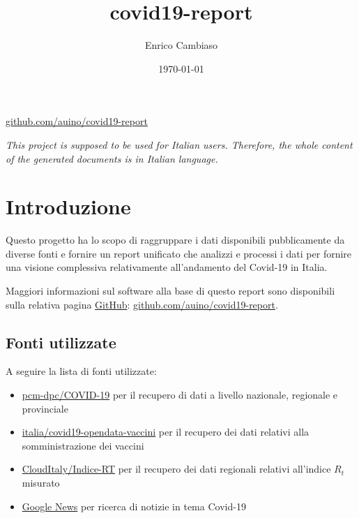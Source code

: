 \documentclass[12pt]{article}
\title{covid19-report}
\author{Enrico Cambiaso}
\date{\today}
\begin{document}
\begin{titlepage}
\maketitle
\thispagestyle{empty}
\vfill
{\centering \small \href{http://github.com/auino/covid19-report}{github.com/auino/covid19-report} \par}
\end{titlepage}

\tableofcontents

\newpage

\begin{center}
\emph{This project is supposed to be used for Italian users. Therefore, the whole content of the generated documents is in Italian language.}
\end{center}

\section{Introduzione}

Questo progetto ha lo scopo di raggruppare i dati disponibili pubblicamente da diverse fonti e fornire un report unificato che analizzi e processi i dati per fornire una visione complessiva relativamente all'andamento del Covid-19 in Italia.

Maggiori informazioni sul software alla base di questo report sono disponibili sulla relativa pagina \href{https://github.com}{GitHub}: \href{https://github.com/auino/covid19-report}{github.com/auino/covid19-report}.

\subsection{Fonti utilizzate}

A seguire la lista di fonti utilizzate:

\begin{itemize}
	\item \href{https://github.com/pcm-dpc/COVID-19}{pcm-dpc/COVID-19} per il recupero di dati a livello nazionale, regionale e provinciale
	\item \href{https://github.com/italia/covid19-opendata-vaccini}{italia/covid19-opendata-vaccini} per il recupero dei dati relativi alla somministrazione dei vaccini
	\item \href{https://github.com/CloudItaly/Indice-RT}{CloudItaly/Indice-RT} per il recupero dei dati regionali relativi all'indice $R_t$ misurato
	\item \href{http://news.google.com}{Google News} per ricerca di notizie in tema Covid-19
\end{itemize}
\end{document}
